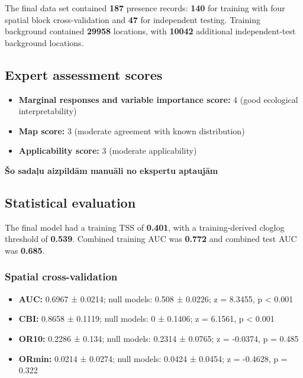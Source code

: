 \documentclass[
  openany]{book}
\providecommand{\tightlist}{%
  \setlength{\itemsep}{0pt}\setlength{\parskip}{0pt}}
\providecommand{\tightlist}{%
  \setlength{\itemsep}{0pt}%
  \setlength{\parskip}{0pt}%
}
\begin{document}
The final data set contained \textbf{187} presence records: \textbf{140} for training with four spatial block cross-validation and \textbf{47} for independent testing. Training background contained \textbf{29958} locations, with \textbf{10042} additional independent-test background locations.

\subsection*{Expert assessment scores}\label{expert-assessment-scores-27}

\begin{itemize}
\tightlist
\item
  \textbf{Marginal responses and variable importance score:} 4 (good ecological interpretability)
\item
  \textbf{Map score:} 3 (moderate agreement with known distribution)
\item
  \textbf{Applicability score:} 3 (moderate applicability)
\end{itemize}

\textbf{Šo sadaļu aizpildām manuāli no ekspertu aptaujām}

\subsection*{Statistical evaluation}\label{statistical-evaluation-27}

The final model had a training TSS of \textbf{0.401}, with a training-derived cloglog threshold of \textbf{0.539}. Combined training AUC was \textbf{0.772} and combined test AUC was \textbf{0.685}.

\subsubsection*{Spatial cross-validation}\label{spatial-cross-validation-27}

\begin{itemize}
\tightlist
\item
  \textbf{AUC:} 0.6967 ± 0.0214; null models: 0.508 ± 0.0226; z = 8.3455, p \textless{} 0.001
\item
  \textbf{CBI:} 0.8658 ± 0.1119; null models: 0 ± 0.1406; z = 6.1561, p \textless{} 0.001
\item
  \textbf{OR10:} 0.2286 ± 0.134; null models: 0.2314 ± 0.0765; z = -0.0374, p = 0.485
\item
  \textbf{ORmin:} 0.0214 ± 0.0274; null models: 0.0424 ± 0.0454; z = -0.4628, p = 0.322
\end{itemize}
\end{document}

